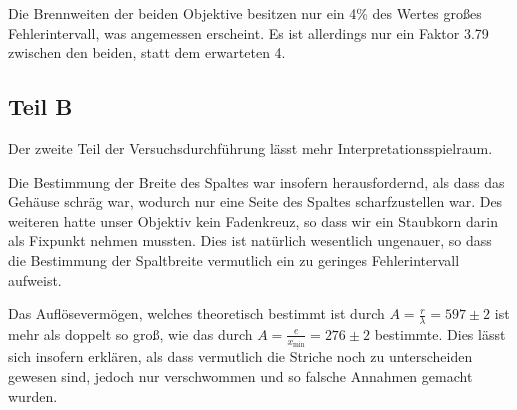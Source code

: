 \documentclass[12pt,a4paper,titlepage,headinclude,bibtotoc]{scrartcl}
\begin{document}
Die Brennweiten der beiden Objektive besitzen nur ein 4\% des Wertes großes Fehlerintervall, was angemessen erscheint.
Es ist allerdings nur ein Faktor 3.79 zwischen den beiden, statt dem erwarteten 4.


\subsection{Teil B}
Der zweite Teil der Versuchsdurchführung lässt mehr Interpretationsspielraum.

Die Bestimmung der Breite des Spaltes war insofern herausfordernd, als dass das Gehäuse schräg war, wodurch nur eine Seite des Spaltes scharfzustellen war.
Des weiteren hatte unser Objektiv kein Fadenkreuz, so dass wir ein Staubkorn darin als Fixpunkt nehmen mussten.
Dies ist natürlich wesentlich ungenauer, so dass die Bestimmung der Spaltbreite vermutlich ein zu geringes Fehlerintervall aufweist.

Das Auflösevermögen, welches theoretisch bestimmt ist durch $A=\frac{r}{\lambda}=597\pm2$ ist mehr als doppelt so groß, wie das durch $A=\frac{e}{x_\text{min}}=276\pm2$ bestimmte.
Dies lässt sich insofern erklären, als dass vermutlich die Striche noch zu unterscheiden gewesen sind, jedoch nur verschwommen und so falsche Annahmen gemacht wurden.







\end{document}
